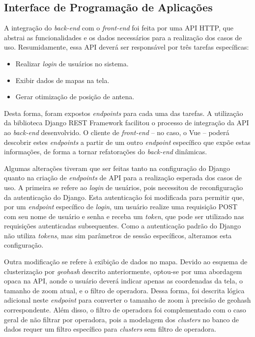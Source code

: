 \documentclass[]{politex}
\begin{document}
\subsection{Interface de Programação de Aplicações}

A integração do \textit{back-end} com o \textit{front-end} foi feita por uma API
HTTP, que abstrai as funcionalidades e os dados necessários para a realização
dos casos de uso. Resumidamente, essa API deverá ser responsável por três
tarefas específicas:

\begin{itemize}
\item Realizar \textit{login} de usuários no sistema.
\item Exibir dados de mapas na tela.
\item Gerar otimização de posição de antena.
\end{itemize}

Desta forma, foram expostos \textit{endpoints} para cada uma das tarefas. A
utilização da biblioteca Django REST Framework facilitou o processo de
integração da API ao \textit{back-end} desenvolvido. O cliente de
\textit{front-end} -- no caso, o Vue -- poderá descobrir estes
\textit{endpoints} a partir de um outro \textit{endpoint} específico que expõe
estas informações, de forma a tornar refatorações do \textit{back-end}
dinâmicas.

Algumas alterações tiveram que ser feitas tanto na configuração do Django quanto
na criação de \textit{endpoints} de API para a realização esperada dos casos de
uso. A primeira se refere ao \textit{login} de usuários, pois necessitou de
reconfiguração da autenticação do Django. Esta autenticação foi modificada para
permitir que, por um \textit{endpoint} específico de \textit{login}, um usuário
realize uma requisição POST com seu nome de usuário e senha e receba um
\textit{token}, que pode ser utilizado nas requisições autenticadas
subsequentes. Como a autenticação padrão do Django não utiliza \textit{tokens},
mas sim parâmetros de sessão específicos, alteramos esta configuração.

Outra modificação se refere à exibição de dados no mapa. Devido ao esquema de
clusterização por \textit{geohash} descrito anteriormente, optou-se por uma
abordagem opaca na API, aonde o usuário deverá indicar apenas as coordenadas da
tela, o tamanho de zoom atual, e o filtro de operadora. Dessa forma, foi
descrita lógica adicional neste \textit{endpoint} para converter o tamanho de
zoom à precisão de geohash correspondente. Além disso, o filtro de operadora foi
complementado com o caso geral de não filtrar por operadora, pois a modelagem
dos \textit{clusters} no banco de dados requer um filtro específico para
\textit{clusters} sem filtro de operadora.
\end{document}
